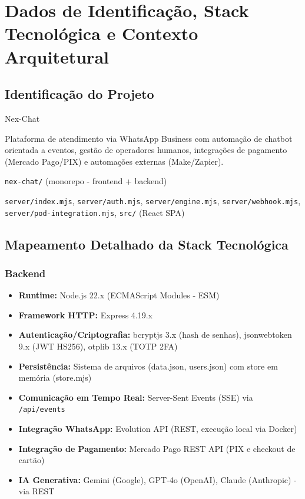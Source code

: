 \documentclass[11pt, a4paper]{article}
\begin{document}
\tableofcontents
\newpage

\section{Dados de Identificação, Stack Tecnológica e Contexto Arquitetural}

\subsection{Identificação do Projeto}

\begin{description}[style=nextline]
  \item[Nome do Projeto:] Nex-Chat
  \item[Descrição:] Plataforma de atendimento via WhatsApp Business com automação de chatbot orientada a eventos, gestão de operadores humanos, integrações de pagamento (Mercado Pago/PIX) e automações externas (Make/Zapier).
  \item[Repositório:] \texttt{nex-chat/} (monorepo - frontend + backend)
  \item[Módulos Críticos:] \texttt{server/index.mjs}, \texttt{server/auth.mjs}, \texttt{server/engine.mjs}, \texttt{server/webhook.mjs}, \texttt{server/pod-integration.mjs}, \texttt{src/} (React SPA)
\end{description}

\subsection{Mapeamento Detalhado da Stack Tecnológica}

\subsubsection{Backend}
\begin{itemize}
  \item \textbf{Runtime:} Node.js 22.x (ECMAScript Modules - ESM)
  \item \textbf{Framework HTTP:} Express 4.19.x
  \item \textbf{Autenticação/Criptografia:} bcryptjs 3.x (hash de senhas), jsonwebtoken 9.x (JWT HS256), otplib 13.x (TOTP 2FA)
  \item \textbf{Persistência:} Sistema de arquivos (data.json, users.json) com store em memória (store.mjs)
  \item \textbf{Comunicação em Tempo Real:} Server-Sent Events (SSE) via \texttt{/api/events}
  \item \textbf{Integração WhatsApp:} Evolution API (REST, execução local via Docker)
  \item \textbf{Integração de Pagamento:} Mercado Pago REST API (PIX e checkout de cartão)
  \item \textbf{IA Generativa:} Gemini (Google), GPT-4o (OpenAI), Claude (Anthropic) - via REST
\end{itemize}
\end{document}
